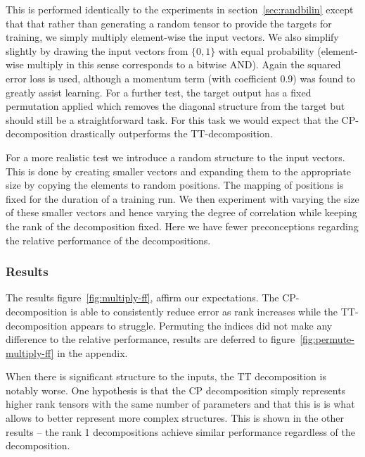 This is performed identically to the experiments in section~\ref{sec:randbilin}
except that that rather than generating a random tensor to provide the targets for training,
we simply multiply element-wise the input vectors. We also simplify slightly by drawing the
input vectors from \(\{0,1\}\) with equal probability
(element-wise multiply in this sense corresponds to a bitwise AND). 
Again the squared error loss is used, although
a momentum term (with coefficient 0.9) was found to greatly assist learning.
For a further test, the target
output has a fixed permutation applied which removes the diagonal structure from the target but
should still be a straightforward task. For this task we would
expect that the CP-decomposition drastically outperforms the TT-decomposition.

For a more realistic test we introduce a random structure to the input vectors. This is done by
creating smaller vectors and expanding them to the appropriate size by copying the
elements to random positions. The mapping of positions is fixed for the duration of a training
run. We then experiment with varying the size of these smaller vectors and hence varying the
degree of correlation while keeping the rank of the decomposition fixed. Here we have fewer
preconceptions regarding the relative performance of the decompositions.

\subsubsection{Results}
The results figure~\ref{fig:multiply-ff}, affirm our
expectations. The CP-decomposition is able to consistently reduce error as rank increases
 while the TT-decomposition appears to struggle. Permuting the indices did not make any
 difference to the relative performance, results are deferred to figure~\ref{fig:permute-multiply-ff}
in the appendix.

When there is significant structure to the inputs, the
TT decomposition is notably worse. One hypothesis is that the CP decomposition simply represents
higher rank tensors with the same number of parameters and that this is is what allows to better
represent more complex structures. This is shown in the other results -- the rank 1 decompositions
achieve similar performance regardless of the decomposition.

